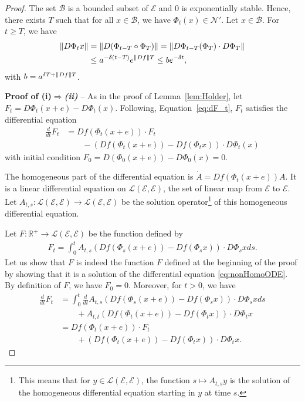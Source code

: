 \documentclass[acmlarge]{acmart}
\newcommand\E{\mathcal{E}}
\newcommand\R{\mathbb{R}}
\newcommand\calL{\mathcal{L}}
\newcommand\calB{\mathcal{B}}
\newcommand\calN{\mathcal{N}}
\newcommand\norm[1]{{\mathchoice{\bnorm{#1}}{\snorm{#1}}{\snorm{#1}}{\snorm{#1}}}}
\newcommand\bnorm[1]{\left\|#1\right\|}
\newcommand\snorm[1]{\|#1\|}
\newcommand\dt{\frac{d}{dt}}
\newcommand\p[1]{\left(#1\right)}
\begin{document}
\begin{proof}
  The set $\calB$ is a bounded subset of $\E$ and $0$ is exponentially
  stable. Hence, there exists $T$ such that for all $x\in\calB$, we
  have $\Phi_t(x)\in \calN'$.  Let $x\in\calB$. For $t\ge T$, we have
  \begin{align*}
    \norm{D\Phi_tx} &= \norm{ D(\Phi_{t-T}\circ\Phi_{T})}
    =\norm{ D\Phi_{t-T}(\Phi_{T}) \cdot D\Phi_{T}}\\
                    &\le a^{-\delta(t-T)}e^{\norm{Df}T}
    \le b e^{-\delta t},
  \end{align*}
  with $b=a^{\delta T + \norm{Df}T}$.
  
  \textbf{Proof of (i)$\Rightarrow$\emph{(ii)}} -- As in the proof of
  Lemma~\ref{lem:Holder}, let $F_t=D\Phi_t(x+e)-D\Phi_t(x)$.
  Following, Equation~\eqref{eq:dF_t}, $F_t$ satisfies the
  differential equation
  \begin{align}
    \dt F_t &= Df (\Phi_t(x+e))\cdot F_t \nonumber\\
            &\qquad -\p{Df(\Phi_t(x+e))-Df(\Phi_tx)}\cdot D\Phi_t(x)
              \label{eq:nonHomoODE}
  \end{align}
  with initial condition $F_0=D(\Phi_0(x+e))-D\Phi_0(x)=0$. 
  
  The homogeneous part of the differential equation is
  $\dot{A} = Df(\Phi_t(x+e)) A$. It is a linear differential equation
  on $\calL(\E,\E)$, the set of linear map from $\E$ to $\E$. Let
  $A_{t,s}:\calL(\E,\E)\to \calL(\E,\E)$ be the solution
  operator\footnote{This means that for $y\in\calL(\E,\E)$, the
    function $s\mapsto A_{t,s}y$ is the solution of the homogeneous
    differential equation starting in $y$ at time $s$.} of this
  homogeneous differential equation.
  
  Let $F:\R^+\to\calL(\E,\E)$ be the function defined by
  \begin{align*}
    F_t = \int_0^t A_{t,s}\p{Df(\Phi_s(x+e))-Df(\Phi_sx)}\cdot
    D\Phi_sxds.
  \end{align*}
  Let us show that $F$ is indeed the function $F$ defined at the
  beginning of the proof by showing that it is a solution of the
  differential equation \eqref{eq:nonHomoODE}. By definition of $F$,
  we have $F_0=0$. Moreover, for $t>0$, we have 
  \begin{align*}
    \dt F_t &= \int_0^t \dt A_{t,s}\p{Df(\Phi_s(x+e))-Df(\Phi_sx)}\cdot 
              D\Phi_s xds \\
            &\qquad +  A_{t,t} \p{Df(\Phi_t(x+e))-Df(\Phi_tx)}\cdot D\Phi_t x\\
            &= Df(\Phi_t(x+e)) \cdot F_t \\
            &\qquad +  \p{Df(\Phi_t(x+e))-Df(\Phi_tx)}\cdot
              D\Phi_tx. 
  \end{align*}
  

\end{proof}
\end{document}
